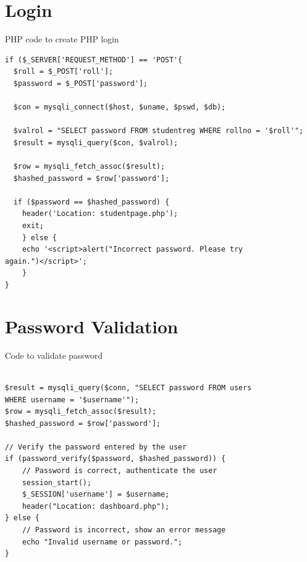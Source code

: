 \documentclass[a4paper,11pt]{report}
\begin{document}
\section{Login}
PHP code to create PHP login
\begin{verbatim}
if ($_SERVER['REQUEST_METHOD'] == 'POST'{
  $roll = $_POST['roll'];
  $password = $_POST['password'];

  $con = mysqli_connect($host, $uname, $pswd, $db);

  $valrol = "SELECT password FROM studentreg WHERE rollno = '$roll'";
  $result = mysqli_query($con, $valrol);

  $row = mysqli_fetch_assoc($result);
  $hashed_password = $row['password'];

  if ($password == $hashed_password) {
    header('Location: studentpage.php');
    exit;
	} else {
    echo '<script>alert("Incorrect password. Please try                                  again.")</script>';
	}
}
\end{verbatim}
\section{Password Validation}
Code to validate password
\begin{verbatim}

$result = mysqli_query($conn, "SELECT password FROM users 
WHERE username = '$username'");
$row = mysqli_fetch_assoc($result);
$hashed_password = $row['password'];

// Verify the password entered by the user
if (password_verify($password, $hashed_password)) {
    // Password is correct, authenticate the user
    session_start();
    $_SESSION['username'] = $username;
    header("Location: dashboard.php");
} else {
    // Password is incorrect, show an error message
    echo "Invalid username or password.";
}


\end{verbatim}
\end{document}
